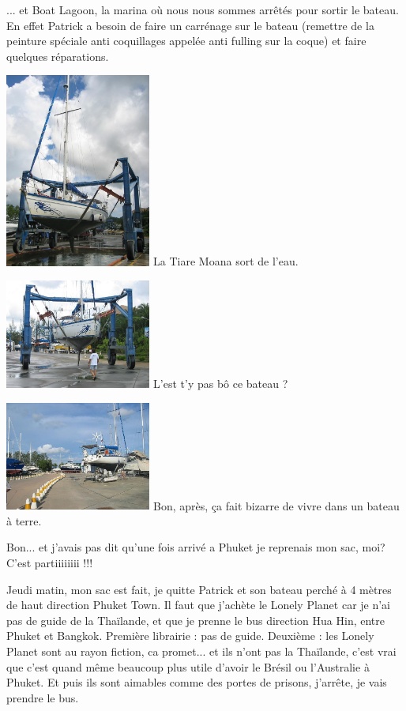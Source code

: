 \begin{multicols}{2}
... et Boat Lagoon, la marina où nous nous sommes arrêtés pour sortir le bateau. En effet Patrick a besoin de faire un carrénage sur le bateau (remettre de la peinture spéciale anti coquillages appelée anti fulling sur la coque) et faire quelques réparations.

\hspace*{-0.65cm}
\includegraphics[width=4.8cm]{articles/Phucket/1212162371CgQw.jpg}
La Tiare Moana sort de l'eau.

\hspace*{-0.65cm}
\includegraphics[width=4.8cm]{articles/Phucket/1212162371bVDs.jpg}
L'est t'y pas bô ce bateau ?

\hspace*{-0.65cm}
\includegraphics[width=4.8cm]{articles/Phucket/1212162369pBl0.jpg}
Bon, après, ça fait bizarre de vivre dans un bateau à terre.

Bon... et j'avais pas dit qu'une fois arrivé a Phuket je reprenais mon sac, moi? C'est partiiiiiiii !!!

Jeudi matin, mon sac est fait, je quitte Patrick et son bateau perché à 4 mètres de haut direction Phuket Town. Il faut que j'achète le Lonely Planet car je n'ai pas de guide de la Thaïlande, et que je prenne le bus direction Hua Hin, entre Phuket et Bangkok. Première librairie : pas de guide. Deuxième : les Lonely Planet sont au rayon fiction, ca promet... et ils n'ont pas la Thaïlande, c'est vrai que c'est quand même beaucoup plus utile d'avoir le Brésil ou l'Australie à Phuket. Et puis ils sont aimables comme des portes de prisons, j'arrête, je vais prendre le bus.


\end{multicols}
